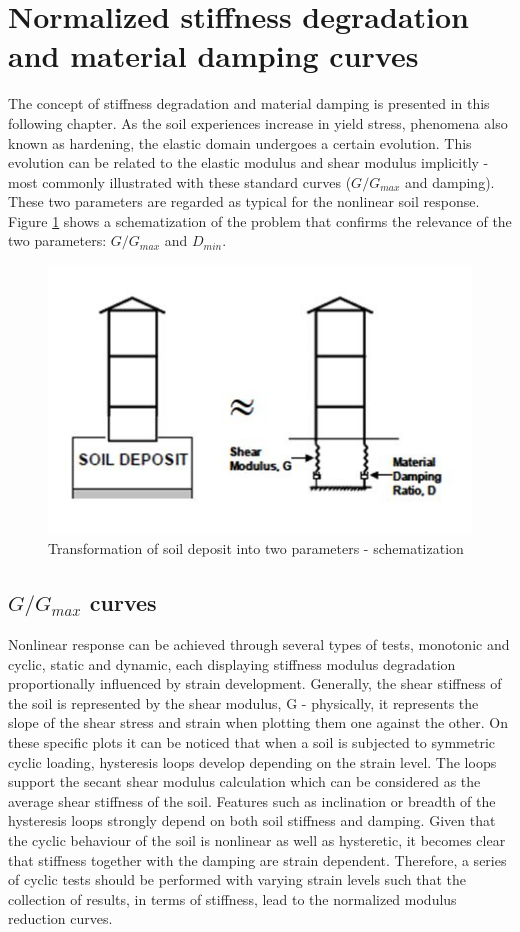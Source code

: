 \documentclass[12pt,a4paper]{report}
\begin{document}
\section{Normalized stiffness degradation and material damping curves}
The concept of stiffness degradation and material damping is presented in this following chapter. As the soil experiences increase in yield stress, phenomena also known as hardening, the elastic domain undergoes a certain evolution. This evolution can be related to the elastic modulus and shear modulus implicitly - most commonly illustrated with these standard curves ($G/G_{max}$ and damping). These two parameters are regarded as typical for the nonlinear soil response. Figure \ref{scheme2} shows a schematization of the problem that confirms the relevance of the two parameters: $G/G_{max}$ and $D_{min}$.

\begin{figure}[h!]
	\centering
	\includegraphics[width=0.6\linewidth]{"soildeposit"}
	\caption{Transformation of soil deposit into two parameters - schematization}
	\label{scheme2}
\end{figure}
\newpage
\subsection{${G/G_{max}}$ curves}
Nonlinear response can be achieved through several types of tests, monotonic and cyclic, static and dynamic, each displaying stiffness modulus degradation proportionally influenced by strain development. Generally, the shear stiffness of the soil is represented by the shear modulus, G - physically, it represents the slope of the shear stress and strain when plotting them one against the other. On these specific plots it can be noticed that when a soil is subjected to symmetric cyclic loading, hysteresis loops develop depending on the strain level. The loops support the secant shear modulus calculation which can be considered as the average shear stiffness of the soil. Features such as inclination or breadth of the hysteresis loops strongly depend on both soil stiffness and damping. Given that the cyclic behaviour of the soil is nonlinear as well as hysteretic, it becomes clear that stiffness together with the damping are strain dependent. Therefore, a series of cyclic tests should be performed with varying strain levels such that the collection of results, in terms of stiffness, lead to the normalized modulus reduction curves.
\end{document}
